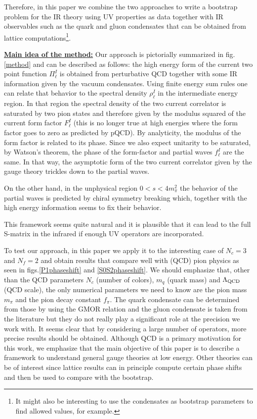 \documentclass[12pt,letterpaper]{article}
\newcommand{\lqcd}{\ensuremath{\Lambda_{\mbox{\scriptsize QCD}}}}
\begin{document}
  Therefore, in this paper we combine the two approaches to write a bootstrap problem for the IR theory using UV properties as data together with IR observables such as the quark and gluon condensates that can be obtained from lattice computations\footnote{It might also be interesting to use the condensates as bootstrap parameters to find allowed values, for example.}.  
  \bigskip
  
  {\bf\underline{Main idea of the method:} } Our approach is pictorially summarized in fig.\ref{method} and can be described as follows:
  the high energy form of the current two point function $\Pi^{I}_\ell$ is obtained from perturbative QCD together with some IR information given by the vacuum condensates. Using finite energy sum rules one can relate that behavior to the spectral density $\rho^I_{\ell}$ in the intermediate energy region. In that region the spectral density of the two current correlator is saturated by two pion states and therefore given by the modulus squared of the current form factor $F^I_{\ell}$ (this is no longer true at high energies where the form factor goes to zero as predicted by pQCD). By analyticity, the modulus of the form factor is related to its phase. Since we also expect unitarity to be saturated, by Watson's theorem, the phase of the form-factor and partial waves $f^I_{\ell}$ are the same. In that way, the asymptotic form of the two current correlator given by the gauge theory trickles down to the partial waves.  
  
  On the other hand, in the unphysical region $0<s<4m_{\pi}^2$ the behavior of the partial waves is predicted by chiral  symmetry breaking which, together with the high energy information seems to fix their behavior.

\bigskip  
  This framework seems quite natural and it is plausible that it can lead to the full S-matrix in the infrared if enough UV operators are incorporated. 
  
  To test our approach, in this paper we apply it to the interesting case of $N_c=3$ and $N_f=2$ and obtain results that compare well with (QCD) pion physics as seen in figs.\ref{P1phaseshift} and \ref{S0S2phaseshift}. We should emphasize that, other than the QCD parameters $N_c$ (number of colors), $m_q$ (quark mass) and $\lqcd$ (QCD scale), the only numerical parameters we need to know are the pion mass $m_\pi$ and the pion decay constant $f_\pi$. The quark condensate can be determined from those by using the GMOR\cite{PhysRev.175.2195} relation and the gluon condensate is taken from the literature but they do not really play a significant role at the precision we work with. It seems clear that by considering a large number of operators, more precise results should be obtained. Although QCD is a primary motivation for this work, we emphasize that the main objective of this paper is to describe a framework to understand general gauge theories at low energy. Other theories can be of interest since lattice results can in principle compute certain phase shifts and then be used to compare with the bootstrap. 
    
\end{document}
